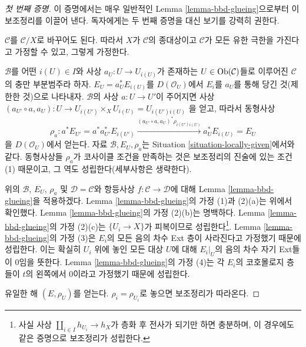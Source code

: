 \begin{proof}[첫 번째 증명]
이 증명에서는 매우 일반적인 Lemma \ref{lemma-bbd-glueing}으로부터
이 보조정리를 이끌어 낸다. 독자에게는 두 번째 증명을 대신 보기를
강력히 권한다.%

\medskip\noindent
$\mathcal{C}$를 $\mathcal{C}/X$로 바꾸어도 된다.
따라서 $X$가 $\mathcal{C}$의 종대상이고 $\mathcal{C}$가 모든 유한
극한을 가진다고 가정할 수 있고, 그렇게 가정한다.

\medskip\noindent
$\mathcal{B}$를 어떤 $i(U) \in I$와 사상
$a_U : U \to U_{i(U)}$가 존재하는 $U \in \mathop{\mathrm{Ob}}\nolimits(\mathcal{C})$들로 이루어진
$\mathcal{C}$의 충만 부분범주라 하자.
$E_U = a_U^*E_{i(U)}$를 $D(\mathcal{O}_U)$에서
$E_i$를 $a_U$를 통해 당긴 것(제한한 것)으로 나타내자.
$\mathcal{B}$의 사상 $a : U \to U'$이 주어지면 사상
$(a_{U'} \circ a, a_U) : U \to U_{i(U')} \times_X U_{i(U)} = U_{i(U')i(U)}$
을 얻고, 따라서 동형사상
$$
\rho_a :
a^*E_{U'} = a^*a_{U'}^*E_{i(U')}
\xrightarrow{(a_{U'} \circ a, a_U)^*\rho_{i(U')i(U)}}
a_{U}^*E_{i(U)} = E_{U}
$$
을 $D(\mathcal{O}_U)$에서 얻는다. 자료 $\mathcal{B}, E_U, \rho_a$는
Situation \ref{situation-locally-given}에서와 같다. 동형사상들 $\rho_a$가
코사이클 조건을 만족하는 것은 보조정리의 진술에 있는 조건 (1) 때문이고,
그 역도 성립한다(세부사항은 생략한다).

\medskip\noindent
위의 $\mathcal{B}$, $E_U$, $\rho_a$ 및 $\mathcal{D} = \mathcal{C}$와
항등사상 $f : \mathcal{C} \to \mathcal{D}$에 대해 Lemma
\ref{lemma-bbd-glueing}을 적용하겠다.
Lemma \ref{lemma-bbd-glueing}의 가정 (1)과 (2)(a)는 위에서 확인했다.
Lemma \ref{lemma-bbd-glueing}의 가정 (2)(b)는 명백하다.
Lemma \ref{lemma-bbd-glueing}의 가정 (2)(c)는
$\{U_i \to X\}$가 피복이므로 성립한다\footnote{사실 사상
$\coprod_{i \in I} h_{U_i} \to h_X$가 층화 후 전사가 되기만 하면
충분하며, 이 경우에도 같은 증명으로 보조정리가 성립한다.}.
Lemma \ref{lemma-bbd-glueing}의 가정 (3)은 $E_i$의 모든 음의 차수 Ext
층이 사라진다고 가정했기 때문에 성립한다. 이는 확실히 $U_i$ 위에 놓인
모든 대상 $U$에 대해 $E_i|_U$의 음의 차수 자기 Ext들이 0임을 뜻한다.
Lemma \ref{lemma-bbd-glueing}의 가정 (4)는 각 $E_i$의 코호몰로지 층들이
$t$의 왼쪽에서 0이라고 가정했기 때문에 성립한다.

\medskip\noindent
유일한 해 $(E, \rho_U)$를 얻는다. $\rho_i = \rho_{U_i}$로 놓으면
보조정리가 따라온다.
\end{proof}

